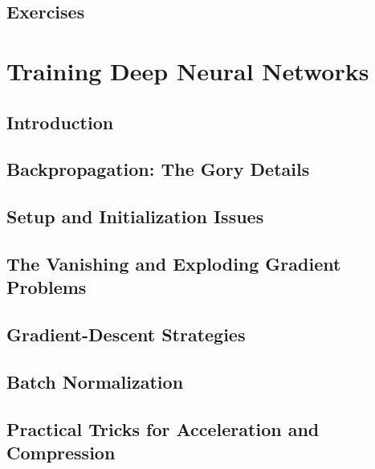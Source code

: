 \documentclass[a4paper]{article}
\begin{document}
\subsection{Exercises}

\newpage
\section{Training Deep Neural Networks}
\subsection{Introduction}

\subsection{Backpropagation: The Gory Details}

\subsection{Setup and Initialization Issues}

\subsection{The Vanishing and Exploding Gradient Problems}

\subsection{Gradient-Descent Strategies}

\subsection{Batch Normalization}

\subsection{Practical Tricks for Acceleration and Compression}
\end{document}
